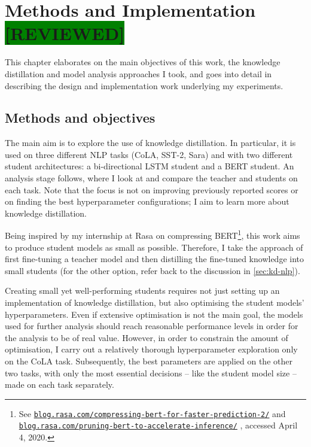 \documentclass[bsc,frontabs,twoside,singlespacing,parskip,deptreport]{infthesis}
\def\reviewed{\colorbox{green}{[REVIEWED]}}
\newcommand\rurl[1]{%
  \href{https://#1}{\nolinkurl{#1}}%
}
\begin{document}
\chapter{Methods and Implementation \reviewed}{
  \label{chap:methods-implementation}

  This chapter elaborates on the main objectives of this work, the knowledge distillation and model analysis approaches I took, and goes into detail in describing the design and implementation work underlying my experiments.

  \section{Methods and objectives}{
    \label{sec:methods}
    The main aim is to explore the use of knowledge distillation. In particular, it is used on three different NLP tasks (CoLA, SST-2, Sara) and with two different student architectures: a bi-directional LSTM student and a BERT student. An analysis stage follows, where I look at and compare the teacher and students on each task. 
    Note that the focus is not on improving previously reported scores or on finding the best hyperparameter configurations; I aim to learn more about knowledge distillation.

    Being inspired by my internship at Rasa on compressing BERT\footnote{See \rurl{blog.rasa.com/compressing-bert-for-faster-prediction-2/} and \rurl{blog.rasa.com/pruning-bert-to-accelerate-inference/}, accessed April 4, 2020.}, this work aims to produce student models as small as possible.
    Therefore, I take the approach of first fine-tuning a teacher model and then distilling the fine-tuned knowledge into small students (for the other option, refer back to the discussion in \autoref{sec:kd-nlp}).

    Creating small yet well-performing students requires not just setting up an implementation of knowledge distillation, but also optimising the student models' hyperparameters.
    Even if extensive optimisation is not the main goal, the models used for further analysis should reach reasonable performance levels in order for the analysis to be of real value.
    However, in order to constrain the amount of optimisation, I carry out a relatively thorough hyperparameter exploration only on the CoLA task. 
    Subsequently, the best parameters are applied on the other two tasks, with only the most essential decisions -- like the student model size -- made on each task separately.

}}
\end{document}
